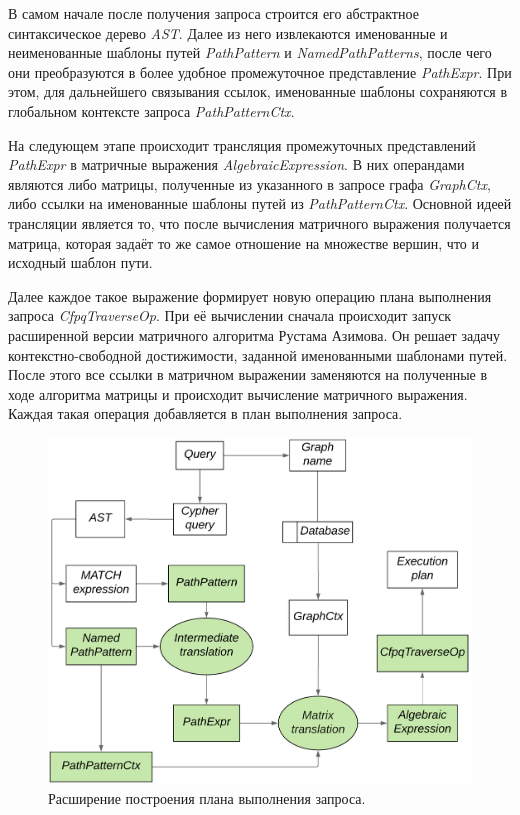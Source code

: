 В самом начале после получения запроса строится его абстрактное синтаксическое дерево \textit{AST}. Далее из него извлекаются именованные и неименованные шаблоны путей \textit{PathPattern} и \textit{NamedPathPatterns}, после чего они преобразуются в более удобное промежуточное представление \textit{PathExpr}. При этом, для дальнейшего связывания ссылок, именованные шаблоны сохраняются в глобальном контексте запроса \textit{PathPatternCtx}.

На следующем этапе происходит трансляция промежуточных представлений \textit{PathExpr} в матричные выражения \textit{AlgebraicExpression}. В них операндами являются либо матрицы, полученные из указанного в запросе графа \textit{GraphCtx}, либо ссылки на именованные шаблоны путей из \textit{PathPatternCtx}. Основной идеей трансляции является то, что после вычисления матричного выражения получается матрица, которая задаёт то же самое отношение на множестве вершин, что и исходный шаблон пути.

Далее каждое такое выражение формирует новую операцию плана выполнения запроса \textit{CfpqTraverseOp}. При её вычислении сначала происходит запуск расширенной версии матричного алгоритма Рустама Азимова. Он решает задачу контекстно-свободной достижимости, заданной именованными шаблонами путей. После этого все ссылки в матричном выражении заменяются на полученные в ходе алгоритма матрицы и происходит вычисление матричного выражения. Каждая такая операция добавляется в план выполнения запроса.


\begin{figure}[H]
\centering
    \includegraphics[width=1.0\linewidth]{Terekhov/pictures/execution_plan_3.png}
    \caption{Расширение построения плана выполнения запроса.}
    \label{fig:execution_plan}
\end{figure}

